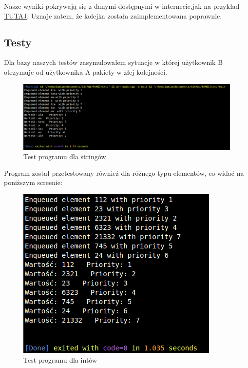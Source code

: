 \documentclass{article}
\begin{document}
Nasze wyniki pokrywają się z danymi dostępnymi w internecie,jak na przykład 
\href{https://eduinf.waw.pl/inf/alg/001_search/0106.php}{TUTAJ}. Uznaje zatem,
że kolejka została zaimplementowana poprawnie.


\subsection{Testy}
Dla bazy naszych testów zasymulowałem sytuacje w której użytkownik B otrzymuje od
użytkownika A pakiety w złej kolejności.

\begin{figure}[H]
    \centering
    \hspace*{-4cm}
    \includegraphics[totalheight=7cm]{PQ1.png}
    \caption{Test programu dla stringów}
    \label{2}
\end{figure}

Program został przetestowany również dla różnego typu elementów, co widać na 
poniższym screenie:

\begin{figure}[H]
    \centering
    \hspace*{-1cm}
    \includegraphics[totalheight=7cm]{PQ2.png}
    \caption{Test programu dla intów}
    \label{2}
\end{figure}
\end{document}
